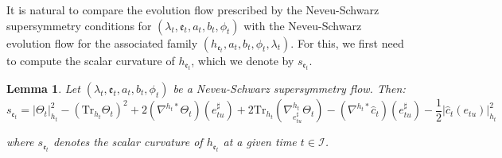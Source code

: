\documentclass[10pt,reqno,a4paper]{amsart}
\theoremstyle{plain}
\newtheorem{lemma}[thm]{Lemma}
\theoremstyle{definition}
\theoremstyle{remark}
\theoremstyle{remark}
\newcommand{\Tr}{\mathrm{Tr}}
\def\cI{\mathcal{I}}
\def\fre{\mathfrak{e}}
\renewcommand{\(}{ (}
\renewcommand{\)}{ )}
\begin{document}
\noindent
It is natural to compare the evolution flow prescribed by the Neveu-Schwarz supersymmetry conditions for $(\lambda_t,\fre_t,a_t,b_t,\phi_t)$ with the Neveu-Schwarz evolution flow for the associated family $(h_{\fre_t},a_t,b_t,\phi_t,\lambda_t)$. For this, we first need to compute the scalar curvature of $h_{\fre_t}$, which we denote by $s_{\fre_t}$.

\begin{lemma}
\label{lemma:curvaturesusyflow}
Let $(\lambda_t,\fre_t, a_t , b_t,\phi_t)$ be a Neveu-Schwarz supersymmetry flow. Then:
\begin{equation*}
s_{\fre_t}=\vert\Theta_t\vert^2_{h_t}-(\Tr_{h_t}\Theta_t)^2+2(\nabla^{h_t\ast}\Theta_t)(e^{\sharp}_{tu})+2\Tr_{h_t}(\nabla^{h_t}_{e^{\sharp}_{tu}}\Theta_t)-(\nabla^{h_t\ast}\widehat{c}_t )(e^{\sharp}_{tu})-\frac{1}{2}\vert\widehat{c}_t (e_{tu})\vert_{h_t}^2
\end{equation*}

\noindent
where $s_{\fre_t}$ denotes the scalar curvature of $h_{\fre_t}$ at a given time $t\in \cI$. 
\end{lemma} 
\end{document}
